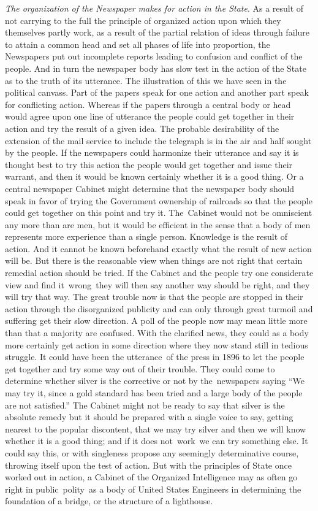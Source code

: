 \documentclass[twoside,symmetric,nobib,justified]{tufte-book}
\begin{document}
\emph{The organization of the Newspaper makes for action in the State}.
As a result of not carrying to the full the principle of organized
action upon which they themselves partly work, as a result of the
partial relation of ideas through failure to attain a common head and
set all phases of life into proportion, the Newspapers put out
incomplete reports leading to confusion and conflict of the people. And
in turn the newspaper body has slow test in the action of the State as
to the truth of its utterance. The illustration of this we have seen in
the political canvass. Part of the papers speak for one action and
another part speak for conflicting action. Whereas if the papers through
a central body or head would agree upon one line of utterance the people
could get together in their action and try the result of a given idea.
The probable desirability of the extension of the mail service to
include the telegraph is in the air and half sought by the people. If
the newspapers could harmonize their utterance and say it is thought
best to try this action the people would get together and issue their
warrant, and then it would be known certainly whether it is a good
thing. Or a central newspaper Cabinet might determine that the newspaper
body should speak in favor of trying the Government ownership of
railroads so that the people could get together on this point and try
it. The~Cabinet would not be omniscient any more than are men, but it
would be efficient in the sense that a body of men represents more
experience than a single person. Knowledge is the result of action. And
it cannot be known beforehand exactly what the result of new action will
be. But there is the reasonable view when things are not right that
certain remedial action should be tried. If the Cabinet and the people
try one considerate view and find it~wrong~they will then say another
way should be right, and they will try that way. The great trouble now
is that the people are stopped in their action through the disorganized
publicity and can only through great turmoil and suffering get their
slow direction. A poll of the people now may mean little more than that
a majority are confused. With the clarified news, they could as a body
more certainly get action in some direction where they now stand still
in tedious struggle. It could have been the utterance~of the press in
1896 to let the people get together and try some way out of their
trouble. They could come to determine whether silver is the corrective
or not by the~newspapers saying ``We may try it, since a gold standard
has been tried and a large body of the people are not satisfied.'' The
Cabinet might not be ready to say that silver is the absolute remedy but
it should be prepared with a single voice to say, getting nearest to the
popular discontent, that we may try silver and then we will know whether
it is a good thing; and if it does not~work~we can try something else.
It could say this, or with singleness propose any seemingly
determinative course, throwing itself upon the test of action. But with
the principles of State once worked out in action, a Cabinet of the
Organized Intelligence may as often go right in public~polity~as a body
of United States Engineers in determining the foundation of a bridge, or
the structure of a lighthouse.~
\end{document}
